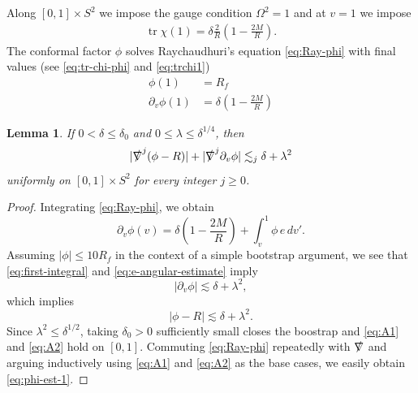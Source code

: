\documentclass[10pt]{article}
\numberwithin{equation}{section}
\theoremstyle{plain}
\newtheorem{lem}{Lemma}[section]
\theoremstyle{definition}
\newcommand{\les}{\lesssim}
\newcommand{\tr}{\operatorname{tr}}
\begin{document}
Along $[0,1]\times S^2$ we impose the gauge condition $\Omega^2=1$ and at $v=1$ we impose
\begin{align}
  \label{eq:trchi1} \tr\chi(1) = \delta \frac{2}{R}\left(1-\frac{2M}{R}\right).
\end{align}
The conformal factor $\phi$ solves Raychaudhuri's equation \eqref{eq:Ray-phi} with final values (see \eqref{eq:tr-chi-phi} and \eqref{eq:trchi1})
\begin{align*}
  \phi(1)  &=R_f\\
   \partial_v\phi(1) &=  \delta \left(1-\frac{2M}{R}\right)
\end{align*}

\begin{lem}
If $0<\delta\leq \delta_0$ and   $0\le \lambda\le \delta^{1/4}$, then 
\begin{equation}
|\slashed\nabla^j(\phi-R)|+|\slashed\nabla^j \partial_v\phi| \les_j \delta +\lambda^2\label{eq:phi-est-1}
\end{equation}
uniformly on $[0,1]\times S^2$ for every integer $j\ge 0$. 
\end{lem}
\begin{proof}
Integrating \eqref{eq:Ray-phi}, we obtain 
\begin{equation}
\partial_v\phi(v) = \delta \left(1-\frac{2M}{R}\right) + \int_v^1 \phi\,e \, dv'.\label{eq:first-integral}
\end{equation}
Assuming $|\phi|\le 10 R_f$ in the context of a simple bootstrap argument, we see that \eqref{eq:first-integral} and \eqref{eq:e-angular-estimate} imply 
\begin{equation}
|\partial_v\phi|\les\delta + \lambda^2, \label{eq:A1}
\end{equation}
which implies 
\begin{equation}
|\phi - R|\les \delta + \lambda^2. \label{eq:A2}
\end{equation} Since $\lambda^2\le \delta^{1/2}$, taking $\delta_0>0$ sufficiently small closes the boostrap and \eqref{eq:A1} and \eqref{eq:A2} hold on $[0,1]$. Commuting \eqref{eq:Ray-phi} repeatedly with $\slashed\nabla$ and arguing inductively using \eqref{eq:A1} and \eqref{eq:A2} as the base cases, we easily obtain \eqref{eq:phi-est-1}. 
\end{proof}
\end{document}
